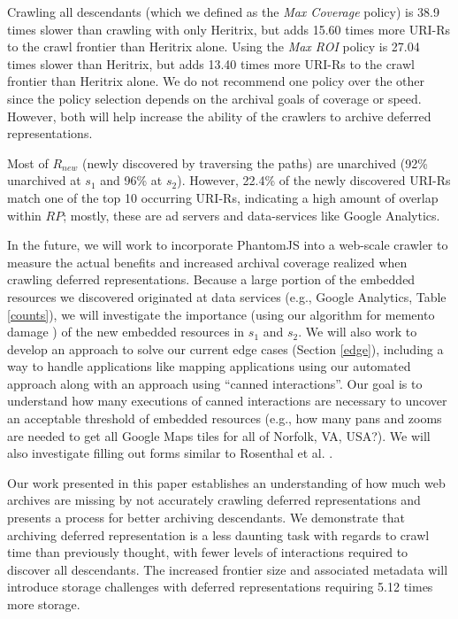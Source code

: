 \documentclass{sig-alternate}
\begin{document}
Crawling all descendants (which we defined as the \emph{Max Coverage} policy) is 38.9 times slower than crawling with only Heritrix, but adds 15.60 times more URI-Rs to the crawl frontier than Heritrix alone. Using the \emph{Max ROI} policy is 27.04 times slower than Heritrix, but adds 13.40 times more URI-Rs to the crawl frontier than Heritrix alone. 
We do not recommend one policy over the other since the policy selection depends on the archival goals of coverage or speed. However, both will help increase the ability of the crawlers to archive deferred representations. 

Most of $R_{new}$ (newly discovered by traversing the paths) are unarchived (92\% unarchived at $s_1$ and 96\% at $s_2$). However, 22.4\% of the newly discovered URI-Rs match one of the top 10 occurring URI-Rs, indicating a high amount of overlap within $RP$; mostly, these are ad servers and data-services like Google Analytics. 

In the future, we will work to incorporate PhantomJS into a web-scale crawler to measure the actual benefits and increased archival coverage realized when crawling deferred representations. Because a large portion of the embedded resources we discovered originated at data services (e.g., Google Analytics, Table \ref{counts}), we will investigate the importance (using our algorithm for memento damage \cite{brunelleDamage, damageIJDL}) of the new embedded resources in $s_1$ and $s_2$. We will also work to develop an approach to solve our current edge cases (Section \ref{edge}), including a way to handle applications like mapping applications using our automated approach along with an approach using ``canned interactions''. Our goal is to understand how many executions of canned interactions are necessary to uncover an acceptable threshold of embedded resources (e.g., how many pans and zooms are needed to get all Google Maps tiles for all of Norfolk, VA, USA?). We will also investigate filling out forms similar to Rosenthal et al. \cite{dshrDlib}.

Our work presented in this paper establishes an understanding of how much web archives are missing by not accurately crawling deferred representations and presents a process for better archiving descendants. We demonstrate that archiving deferred representation is a less daunting task with regards to crawl time than previously thought, with fewer levels of interactions required to discover all descendants. The increased frontier size and associated metadata will introduce storage challenges with deferred representations requiring 5.12 times more storage.
\end{document}
